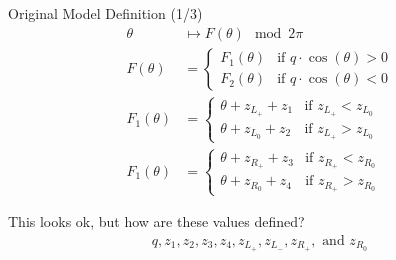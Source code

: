 \begin{frame}{Original Model Definition (1/3)}
    \vspace{-2.0em}
    \begin{align}
        \theta      & \mapsto  F(\theta) \mod 2 \pi
        \\
        F(\theta)   & = \begin{cases}
                            F_1(\theta) & \text{if } q \cdot \cos(\theta) > 0 \\
                            F_2(\theta) & \text{if } q \cdot \cos(\theta) < 0
                        \end{cases}
        \\
        F_1(\theta) & = \begin{cases}
                            \theta + z_{L_+} + z_1 & \text{if } z_{L_+} < z_{L_0} \\
                            \theta + z_{L_0} + z_2 & \text{if } z_{L_+} > z_{L_0}
                        \end{cases}
        \\
        F_1(\theta) & = \begin{cases}
                            \theta + z_{R_+} + z_3 & \text{if } z_{R_+} < z_{R_0} \\
                            \theta + z_{R_0} + z_4 & \text{if } z_{R_+} > z_{R_0}
                        \end{cases}
    \end{align}

    \pause
    \vspace{2em}
    This looks ok, but how are these values defined?
    \begin{align*}
        q, z_1, z_2, z_3, z_4, z_{L_+}, z_{L_-}, z_{R_+}, \text{ and } z_{R_0}
    \end{align*}
\end{frame}

